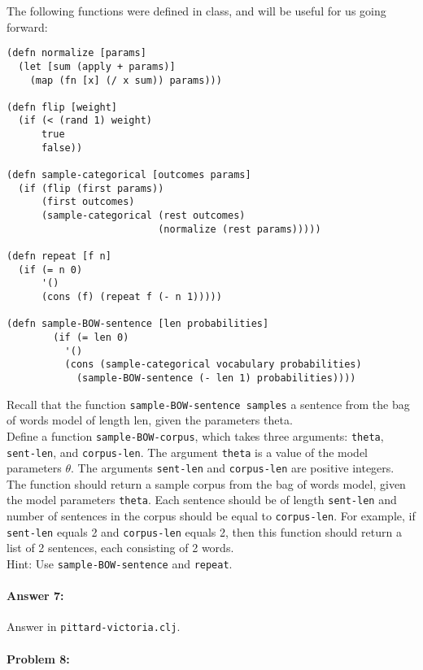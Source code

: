 \documentclass[10pt]{article}
\begin{document}
\noindent The following functions were defined in class, and will be
useful for us going forward:

\begin{lstlisting}
(defn normalize [params]
  (let [sum (apply + params)]
    (map (fn [x] (/ x sum)) params)))

(defn flip [weight]
  (if (< (rand 1) weight)
      true
      false))

(defn sample-categorical [outcomes params]
  (if (flip (first params))
      (first outcomes)
      (sample-categorical (rest outcomes) 
                          (normalize (rest params)))))

(defn repeat [f n]
  (if (= n 0)
      '()
      (cons (f) (repeat f (- n 1)))))

(defn sample-BOW-sentence [len probabilities]
        (if (= len 0)
          '()
          (cons (sample-categorical vocabulary probabilities)
            (sample-BOW-sentence (- len 1) probabilities))))
\end{lstlisting}

\noindent Recall that the function \texttt{sample-BOW-sentence
  samples} a sentence from the bag of words model of length len, given
the parameters theta.
\\

\noindent Define a function \texttt{sample-BOW-corpus}, which takes
three arguments: \texttt{theta}, \texttt{sent-len}, and
\texttt{corpus-len}. The argument \texttt{theta} is a value of the
model parameters $\theta$. The arguments \texttt{sent-len} and
\texttt{corpus-len} are positive integers. The function should return
a sample corpus from the bag of words model, given the model
parameters \texttt{theta}. Each sentence should be of length
\texttt{sent-len} and number of sentences in the corpus should be
equal to \texttt{corpus-len}. For example, if \texttt{sent-len} equals
2 and \texttt{corpus-len} equals 2, then this function should return a
list of 2 sentences, each consisting of 2 words.
\\

\noindent Hint: Use \texttt{sample-BOW-sentence} and \texttt{repeat}.

\paragraph{Answer 7:} Answer in
\texttt{pittard-victoria.clj}.

\hrulefill
\paragraph{Problem 8:}
\end{document}
